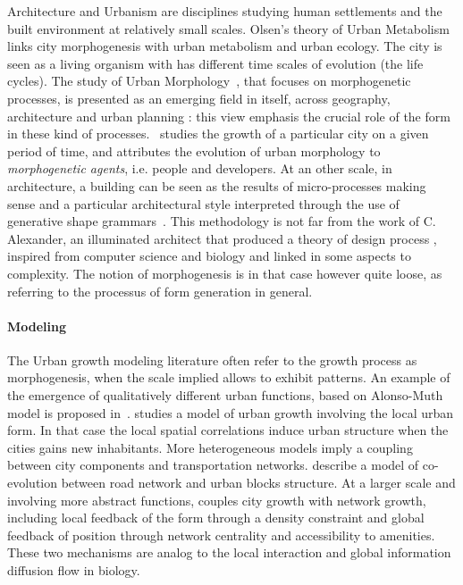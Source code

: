 \documentclass[fleqn,10pt]{wlscirep}
\begin{document}
Architecture and Urbanism are disciplines studying human settlements and the built environment at relatively small scales. Olsen's theory of Urban Metabolism \cite{olsen1982urban} links city morphogenesis with urban metabolism and urban ecology. The city is seen as a living organism with has different time scales of evolution (the life cycles). The study of Urban Morphology~\cite{moudon1997urban}, that focuses on morphogenetic processes, is presented as an emerging field in itself, across geography, architecture and urban planning : this view emphasis the crucial role of the form in these kind of processes.~\cite{burke1972dublin} studies the growth of a particular city on a given period of time, and attributes the evolution of urban morphology to \emph{morphogenetic agents}, i.e. people and developers. At an other scale, in architecture, a building can be seen as the results of micro-processes making sense and a particular architectural style interpreted through the use of generative shape grammars~\cite{ceccarini2001essai}. This methodology is not far from the work of C. Alexander, an illuminated architect that produced a theory of design process \cite{mehaffy2007notes}, inspired from computer science and biology and linked in some aspects to complexity. The notion of morphogenesis is in that case however quite loose, as referring to the processus of form generation in general.

\cite{dollens2014alan}

\cite{whitehand1999urban}


\paragraph{Modeling}

The Urban growth modeling literature often refer to the growth process as morphogenesis, when the scale implied allows to exhibit patterns. An example of the emergence of qualitatively different urban functions, based on Alonso-Muth model is proposed in~\cite{bonin2012modele}. \cite{makse1998modeling} studies a model of urban growth involving the local urban form. In that case the local spatial correlations induce urban structure when the cities gains new inhabitants. More heterogeneous models imply a coupling between city components and transportation networks. \cite{achibet2014model} describe a model of co-evolution between road network and urban blocks structure. At a larger scale and involving more abstract functions, \cite{raimbault2014hybrid} couples city growth with network growth, including local feedback of the form through a density constraint and global feedback of position through network centrality and accessibility to amenities. These two mechanisms are analog to the local interaction and global information diffusion flow in biology.
\end{document}
